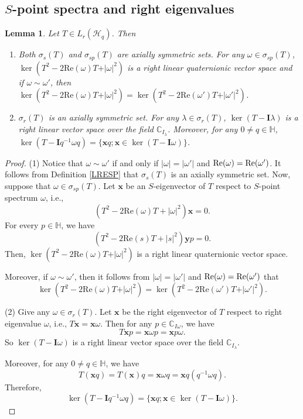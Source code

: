 \documentclass[pdflatex,sn-mathphys-num]{sn-jnl}%
\theoremstyle{thmstyleone}%
\theoremstyle{thmstyletwo}%
\theoremstyle{thmstylethree}%
\newtheorem{lemma}{Lemma}%
\newtheorem{lemma}[theorem]{Lemma}
\theoremstyle{definition}
\theoremstyle{remark}
\begin{document}
\subsection{$S$-point spectra and right eigenvalues}

\begin{lemma}\label{SpR}
Let $T \in L_r(\mathcal{H}_q)$. Then
\begin{enumerate}
	\item[(1)]  Both $\sigma_s(T)$ and $\sigma_{sp}(T)$ are axially symmetric sets. For any $\omega\in\sigma_{sp}(T)$, $\ker(T^2-2\mathrm{Re}(\omega)T+\vert\omega \vert^2)$ is a right linear quaternionic vector space and if $\omega\sim\omega'$, then $\ker(T^2-2\mathrm{Re}(\omega)T+\vert\omega \vert^2)=\ker(T^2-2\mathrm{Re}(\omega')T+\vert\omega' \vert^2)$.
	\item[(2)]  $\sigma_r(T)$ is an axially symmetric set. For any $\lambda\in\sigma_r(T)$, $\ker(T-\mathbf{I}\lambda)$ is a right linear vector space over the field $\mathbb{C}_{I_\lambda}$. Moreover, for any $0\neq q\in\mathbb{H}$, $\ker(T-\boldsymbol{I}q^{-1}\omega q)=\{\boldsymbol{x}q; \boldsymbol{x}\in\ker(T-\boldsymbol{I}\omega)\}$.
	\end{enumerate}
\end{lemma}
    \begin{proof}
  (1) Notice that $\omega\sim\omega'$ if and only if $\vert\omega\vert=\vert\omega'\vert$ and $\rm{Re}(\omega)=\rm{Re}(\omega')$. It follows from Definition \ref{LRESP} that $\sigma_s(T)$ is an axially symmetric set. Now, suppose that $\omega\in\sigma_{sp}(T)$.
  Let $\boldsymbol{x}$ be an $S$-eigenvector of $T$ respect to $S$-point spectrum $\omega$, i.e.,
  \[
  (T^2-2\mathrm{Re}(\omega)T+|\omega|^2)\boldsymbol{x}=0.
  \]
  For every $p\in\mathbb{H}$, we have
  \[
  (T^2-2\mathrm{Re}(s)T+|s|^2)\boldsymbol{y}p=0.
  \]
  Then, $\ker(T^2-2\mathrm{Re}(\omega)T+\vert\omega \vert^2)$ is a right linear quaternionic vector space.

  Moreover, if $\omega\sim\omega'$, then it follows from $\vert\omega\vert=\vert\omega'\vert$ and $\rm{Re}(\omega)=\rm{Re}(\omega')$ that
  \[
  \ker(T^2-2\mathrm{Re}(\omega)T+\vert\omega \vert^2)=\ker(T^2-2\mathrm{Re}(\omega')T+\vert\omega' \vert^2).
  \]



  (2) Give any $\omega\in\sigma_r(T)$. Let $\boldsymbol{x}$ be the right eigenvector of $T$ respect to right eigenvalue $\omega$, i.e., $T\boldsymbol{x}=\boldsymbol{x}\omega$.
  Then for any $p\in\mathbb{C}_{I\omega}$, we have
  \[
  T\boldsymbol{x}p=\boldsymbol{x}\omega p=\boldsymbol{x}p\omega.
  \]
  So $\ker(T-\mathbf{I}\omega)$ is a right linear vector space over the field $\mathbb{C}_{I_\lambda}$.


  Moreover, for any $0\neq q\in\mathbb{H}$, we have
  \[
  T(\boldsymbol{x}q)=T(\boldsymbol{x})q=\boldsymbol{x}\omega q=\boldsymbol{x}q(q^{-1}\omega q).
  \]
  Therefore,
  \[
  \ker(T-\boldsymbol{I}q^{-1}\omega q)=\{\boldsymbol{x}q; \boldsymbol{x}\in\ker(T-\boldsymbol{I}\omega)\}.
  \]
    \end{proof}
\end{document}
